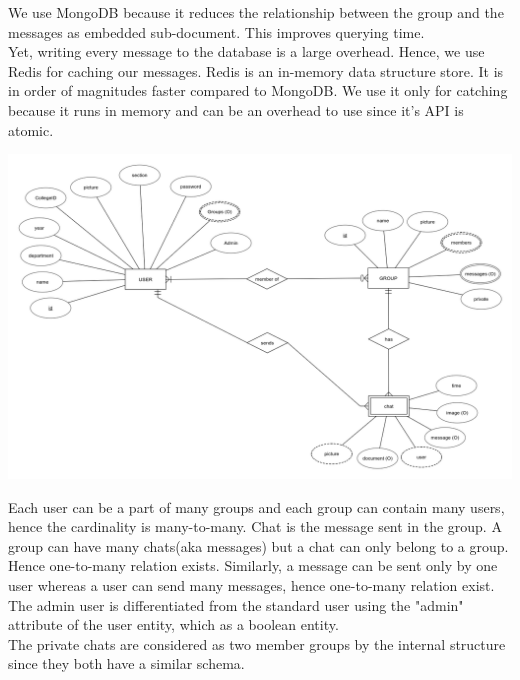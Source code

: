 \documentclass{scrreprt}
\begin{document}
We use MongoDB because it reduces the relationship between the group and the messages
as embedded sub-document. This improves querying time. \\

Yet, writing every message to the database is a large overhead. Hence, we use
Redis for caching our messages. Redis is an in-memory data structure store. It
is in order of magnitudes faster compared to MongoDB. We use it only for
catching because it runs in memory and can be an overhead to use since it's API
is atomic. \\

\begin{center}
\includegraphics[scale=.4]{er2}
\end{center}

Each user can be a part of many groups and each group can contain many users, hence
the cardinality is many-to-many. Chat is the message sent in the group. A group
can have many chats(aka messages) but a chat can only belong to a group. Hence
one-to-many relation exists. Similarly, a message can be sent only by one user
whereas a user can send many messages, hence one-to-many relation exist. \\

The admin user is differentiated from the standard user using the "admin"
attribute of the user entity, which as a boolean entity. \\

The private chats are considered as two member groups by the internal structure
since they both have a similar schema. \\
\end{document}
